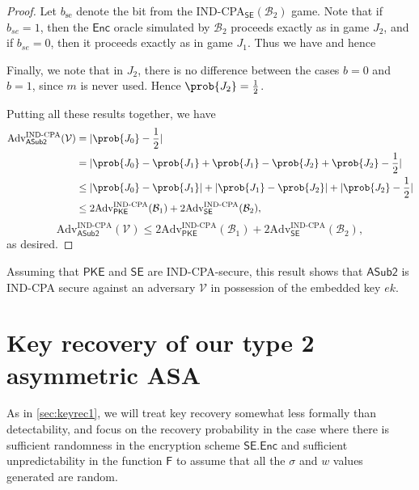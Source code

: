 \begin{proof}
Let $b_\text{se}$ denote the bit from the IND-CPA$_\mathsf{SE}(\mathcal{B}_2)$ game. Note that if $b_{se}=1$, then the $\mathsf{Enc}$ oracle simulated by $\mathcal{B}_2$ proceeds exactly as in game $J_2$, and if $b_{se}=0$, then it proceeds exactly as in game $J_1$. Thus we have
and hence

Finally, we note that in $J_2$, there is no difference between the cases $b=0$ and $b=1$, since $m$ is never used. Hence $\prob{J_2}=\frac{1}{2}$.

Putting all these results together, we have
\iffullversion
\begin{align*}
\mathrm{Adv}^{\mathrm{IND}\text{-}\mathrm{CPA}}_{\mathsf{ASub2}}(\mathcal{V})
&= |\prob{J_0}-\frac{1}{2}| \\
&= |\prob{J_0}-\prob{J_1}+\prob{J_1}-\prob{J_2}+\prob{J_2}-\frac{1}{2}| \\
&\le |\prob{J_0}-\prob{J_1}|+|\prob{J_1}-\prob{J_2}|+|\prob{J_2}-\frac{1}{2}| \\
&\le 2\mathrm{Adv}^{\mathrm{IND}\text{-}\mathrm{CPA}}_{\mathsf{PKE}}(\mathcal{B}_1) + 2\mathrm{Adv}^{\mathrm{IND}\text{-}\mathrm{CPA}}_{\mathsf{SE}}(\mathcal{B}_2),
\end{align*}
\else
\[
\mathrm{Adv}^{\mathrm{IND}\text{-}\mathrm{CPA}}_{\mathsf{ASub2}}(\mathcal{V})\le 2\mathrm{Adv}^{\mathrm{IND}\text{-}\mathrm{CPA}}_{\mathsf{PKE}}(\mathcal{B}_1) + 2\mathrm{Adv}^{\mathrm{IND}\text{-}\mathrm{CPA}}_{\mathsf{SE}}(\mathcal{B}_2),
\]
\fi
as desired.

\end{proof}

Assuming that $\mathsf{PKE}$ and $\mathsf{SE}$ are IND-CPA-secure, this result shows that $\mathsf{ASub2}$ is IND-CPA secure against an adversary $\mathcal{V}$ in possession of the embedded key $ek$.


\section{Key recovery of our type 2 asymmetric ASA} \label{sec:kr2}
As in \autoref{sec:keyrec1}, we will treat key recovery somewhat less formally than detectability, and focus on the recovery probability in the case where there is sufficient randomness in the encryption scheme $\mathsf{SE.Enc}$ and sufficient unpredictability in the function $\mathsf{F}$ to assume that all the $\sigma$ and $w$ values generated are random.

